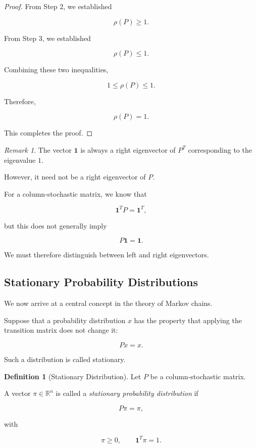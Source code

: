 \documentclass[11pt,a4paper]{article}
\theoremstyle{definition}
\newtheorem{definition}[theorem]{Definition}
\theoremstyle{remark}
\newtheorem{remark}[theorem]{Remark}
\begin{document}
\begin{proof}
From Step 2, we established

\[
\rho(P)\geq1.
\]

From Step 3, we established

\[
\rho(P)\leq1.
\]

Combining these two inequalities,

\[
1\leq\rho(P)\leq1.
\]

Therefore,

\[
\boxed{\rho(P)=1.}
\]

This completes the proof.

\end{proof}
\begin{remark}
The vector $\mathbf{1}$
is always a right eigenvector
of $P^T$ corresponding to
the eigenvalue $1$.

However, it need not be
a right eigenvector of $P$.

For a column-stochastic matrix,
we know that

\[
\mathbf{1}^TP=\mathbf{1}^T,
\]

but this does not generally imply

\[
P\mathbf{1}=\mathbf{1}.
\]

We must therefore distinguish
between left and right
eigenvectors.
\end{remark}

\subsection{Stationary Probability Distributions}

We now arrive at a central
concept in the theory of
Markov chains.

Suppose that a probability
distribution $x$ has the
property that applying the
transition matrix does
not change it:

\[
Px=x.
\]

Such a distribution is
called stationary.

\begin{definition}[Stationary Distribution]

Let $P$ be a column-stochastic
matrix.

A vector $\pi\in\mathbb{R}^n$
is called a \emph{stationary
probability distribution}
if

\begin{equation}
P\pi=\pi,
\label{eq:stationary_distribution}
\end{equation}

with

\[
\pi\geq0,
\qquad
\mathbf{1}^T\pi=1.
\]

\end{definition}
\end{document}
